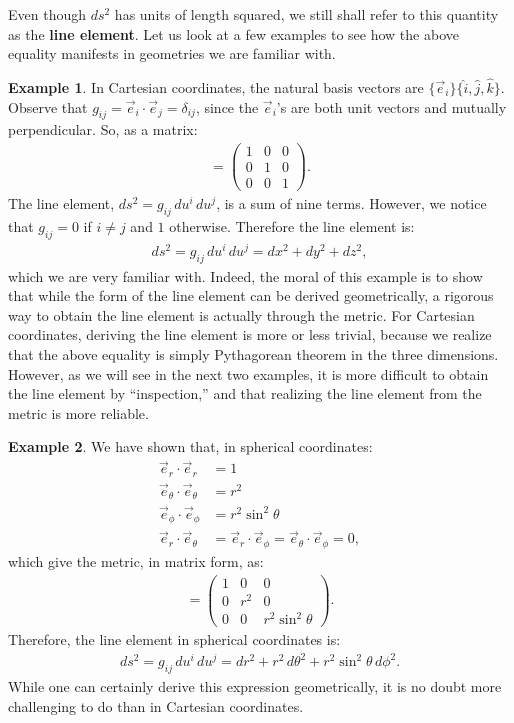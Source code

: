 \documentclass{book}
\theoremstyle{definition}
\newtheorem{exmp}{Example}[section]
\begin{document}
Even though $ds^2$ has units of length squared, we still shall refer to this quantity as the \textbf{line element}. Let us look at a few examples to see how the above equality manifests in geometries we are familiar with.
\begin{exmp}
In Cartesian coordinates, the natural basis vectors are $\{\vec{e}_i\} \{ \hat{i}, \hat{j}, \hat{k}\}$. Observe that $g_{ij} = \vec{e}_i \cdot \vec{e}_j = \delta_{ij}$, since the $\vec{e}_i$'s are both unit vectors and mutually perpendicular. So, as a matrix:
\begin{align*}
[g_{ij}] = 
\begin{pmatrix}
1 & 0 & 0\\
0 & 1 & 0\\
0 & 0 & 1
\end{pmatrix}.
\end{align*}
The line element, $ds^2 = g_{ij}\,du^i\,du^j$, is a sum of nine terms. However, we notice that $g_{ij} = 0 $ if $i\neq j$ and $1$ otherwise. Therefore the line element is:
\begin{align*}
ds^2 = g_{ij}\,du^i\,du^j = dx^2+dy^2+dz^2,
\end{align*}
which we are very familiar with. Indeed, the moral of this example is to show that while the form of the line element can be derived geometrically, a rigorous way to obtain the line element is actually through the metric. For Cartesian coordinates, deriving the line element is more or less trivial, because we realize that the above equality is simply Pythagorean theorem in the three dimensions. However, as we will see in the next two examples, it is more difficult to obtain the line element by ``inspection,'' and that realizing the line element from the metric is more reliable.   
\end{exmp}
\begin{exmp}
We have shown that, in spherical coordinates:
\begin{align*}
\vec{e}_r\cdot\vec{e}_r &= 1\\
\vec{e}_\theta\cdot\vec{e}_\theta &= r^2\\
\vec{e}_\phi\cdot\vec{e}_\phi &= r^2\sin^2\theta\\
\vec{e}_r\cdot\vec{e}_\theta &= \vec{e}_r\cdot\vec{e}_\phi = \vec{e}_\theta\cdot\vec{e}_\phi = 0, 
\end{align*}
which give the metric, in matrix form, as:
\begin{align*}
[g_{ij}] = 
\begin{pmatrix}
1 & 0 & 0\\
0 & r^2 & 0 \\
0 & 0 & r^2\sin^2\theta
\end{pmatrix}.
\end{align*}
Therefore, the line element in spherical coordinates is:
\begin{align*}
ds^2 = g_{ij}\,du^i\,du^j = dr^2 + r^2\,d\theta^2 + r^2\sin^2\theta\,d\phi^2.
\end{align*}
While one can certainly derive this expression geometrically, it is no doubt more challenging to do than in Cartesian coordinates.
\end{exmp}
\end{document}
